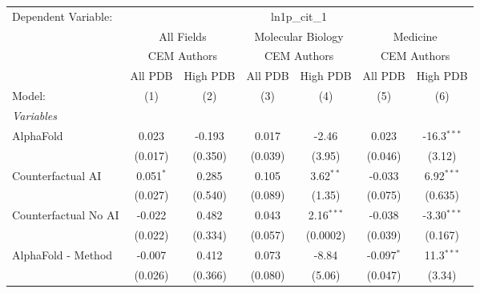\begingroup
\centering
\begin{tabular}{lcccccc}
   \tabularnewline \midrule \midrule
   Dependent Variable: & \multicolumn{6}{c}{ln1p\_cit\_1}\\
 & \multicolumn{2}{c}{All Fields} & \multicolumn{2}{c}{Molecular Biology} & \multicolumn{2}{c}{Medicine} \\
\cmidrule(lr){2-3} \cmidrule(lr){4-5} \cmidrule(lr){6-7}
 & \multicolumn{2}{c}{CEM Authors} & \multicolumn{2}{c}{CEM Authors} & \multicolumn{2}{c}{CEM Authors} \\
\cmidrule(lr){2-3} \cmidrule(lr){4-5} \cmidrule(lr){6-7}
 & \multicolumn{1}{c}{All PDB} & \multicolumn{1}{c}{High PDB} & \multicolumn{1}{c}{All PDB} & \multicolumn{1}{c}{High PDB} & \multicolumn{1}{c}{All PDB} & \multicolumn{1}{c}{High PDB} \\
\cmidrule(lr){2-2} \cmidrule(lr){3-3} \cmidrule(lr){4-4} \cmidrule(lr){5-5} \cmidrule(lr){6-6} \cmidrule(lr){7-7}
   Model:                                                     & (1)            & (2)     & (3)            & (4)          & (5)          & (6)\\  
   \midrule
   \emph{Variables}\\
   AlphaFold                                                  & 0.023          & -0.193  & 0.017          & -2.46        & 0.023        & -16.3$^{***}$\\   
                                                              & (0.017)        & (0.350) & (0.039)        & (3.95)       & (0.046)      & (3.12)\\   
   Counterfactual AI                                          & 0.051$^{*}$    & 0.285   & 0.105          & 3.62$^{**}$  & -0.033       & 6.92$^{***}$\\   
                                                              & (0.027)        & (0.540) & (0.089)        & (1.35)       & (0.075)      & (0.635)\\   
   Counterfactual No AI                                       & -0.022         & 0.482   & 0.043          & 2.16$^{***}$ & -0.038       & -3.30$^{***}$\\   
                                                              & (0.022)        & (0.334) & (0.057)        & (0.0002)     & (0.039)      & (0.167)\\   
   AlphaFold - Method                                         & -0.007         & 0.412   & 0.073          & -8.84        & -0.097$^{*}$ & 11.3$^{***}$\\   
                                                              & (0.026)        & (0.366) & (0.080)        & (5.06)       & (0.047)      & (3.34)\\   

\end{tabular}
